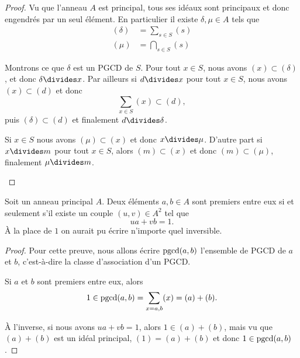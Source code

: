 \begin{proof}
    Vu que l'anneau \( A\) est principal, tous ses idéaux sont principaux et donc engendrés par un seul élément. En particulier il existe \( \delta,\mu\in A\) tels que
    \begin{subequations}
        \begin{align}
            (\delta)&=\sum_{s\in S}(s)\\
            (\mu)&=\bigcap_{s\in S}(s)
        \end{align}
    \end{subequations}
    \begin{subproof}
    \item[PGCD]
        Montrons ce que \( \delta\) est un PGCD de \( S\). Pour tout \( x\in S\), nous avons \( (x)\subset (\delta)\), et donc \( \delta\divides x\). Par ailleurs si \( d\divides x\) pour tout \( x\in S\), nous avons \( (x)\subset (d)\) et donc
        \begin{equation}
            \sum_{x\in S}(x)\subset (d),
        \end{equation}
        puis \( (\delta)\subset (d)\) et finalement \( d\divides \delta\).
        \item[PPCM]
            Si \( x\in S\) nous avons \( (\mu)\subset (x)\) et donc \( x\divides \mu\). D'autre part si \( x\divides m\) pour tout \( x\in S\), alors \( (m)\subset (x)\) et donc \( (m)\subset(\mu)\), finalement \( \mu\divides m\).
    \end{subproof}
\end{proof}

\begin{corollary}\label{CorimHyXy}
    Soit un anneau principal \( A\). Deux éléments \( a,b\in A\) sont premiers entre eux si et seulement s'il existe un couple \( (u, v)\in A^2 \) tel que
    \begin{equation}
        ua+vb=1.
    \end{equation}
    À la place de \( 1\) on aurait pu écrire n'importe quel inversible.
\end{corollary}

\begin{proof}
    Pour cette preuve, nous allons écrire \( \operatorname{pgcd}(a,b)\) l'ensemble de PGCD de \( a\) et \( b\), c'est-à-dire la classe d'association d'un PGCD.

    Si \( a\) et \( b\) sont premiers entre eux, alors
    \begin{equation}
        1\in\operatorname{pgcd}(a,b)=\sum_{x=a,b}(x)=(a)+(b).
    \end{equation}

    À l'inverse, si nous avons \( ua+vb=1\), alors \( 1\in (a)+(b)\), mais vu que \( (a)+(b)\) est un idéal principal, \( (1)=(a)+(b)\) et donc \( 1\in \operatorname{pgcd}(a,b)\).
\end{proof}

